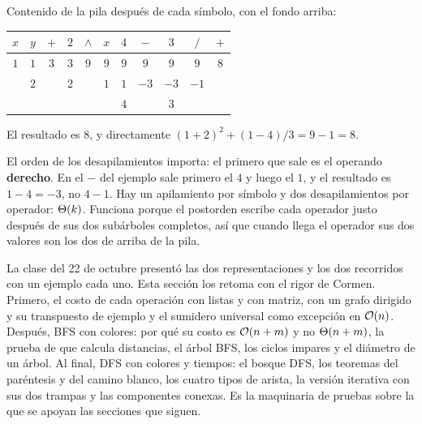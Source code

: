 \documentclass[11pt,letterpaper]{article}
\begin{document}
\begin{ejemplo}[Evaluar la posfija con $x = 1$, $y = 2$]
  \label{ej:arbol-posfija}
  Contenido de la pila después de cada símbolo, con el fondo arriba:
  \begin{center}
  \small
  \begin{tabular}{*{11}{c}}
    \toprule
    $x$ & $y$ & $+$ & $2$ & $\wedge$ & $x$ & $4$ & $-$ & $3$ & $/$
      & $+$ \\
    \midrule
    $1$ & $1$ & $3$ & $3$ & $9$ & $9$ & $9$ & $9$ & $9$ & $9$ & $8$ \\
        & $2$ &     & $2$ &     & $1$ & $1$ & $-3$ & $-3$ & $-1$ & \\
        &     &     &     &     &     & $4$ &      & $3$  &      & \\
    \bottomrule
  \end{tabular}
  \end{center}
  El resultado es $8$, y directamente
  $(1 + 2)^2 + (1 - 4)/3 = 9 - 1 = 8$.
\end{ejemplo}

El orden de los desapilamientos importa: el primero que sale es el
operando \textbf{derecho}. En el $-$ del ejemplo sale primero el $4$
y luego el $1$, y el resultado es $1 - 4 = -3$, no $4 - 1$. Hay un
apilamiento por símbolo y dos desapilamientos por operador:
$\Theta\!\left(k\right)$. Funciona porque el postorden escribe cada operador justo
después de sus dos subárboles completos, así que cuando llega el
operador sus dos valores son los dos de arriba de la pila.

\newpage


\label{sec:busquedas}

\begin{quick_sum}
  La clase del 22 de octubre presentó las dos representaciones y los
  dos recorridos con un ejemplo cada uno. Esta sección los retoma con
  el rigor de Cormen. Primero, el costo de cada operación con listas y
  con matriz, con un grafo dirigido y su transpuesto de ejemplo y el
  sumidero universal como excepción en $\mathcal{O}\!\left(n\right)$. Después, BFS con
  colores: por qué su costo es $\mathcal{O}\!\left(n + m\right)$ y no $\Theta\!\left(n + m\right)$, la
  prueba de que calcula distancias, el árbol BFS, los ciclos impares y
  el diámetro de un árbol. Al final, DFS con colores y tiempos: el
  bosque DFS, los teoremas del paréntesis y del camino blanco, los
  cuatro tipos de arista, la versión iterativa con sus dos trampas y
  las componentes conexas. Es la maquinaria de pruebas sobre la que se
  apoyan las secciones que siguen.
\end{quick_sum}
\end{document}
